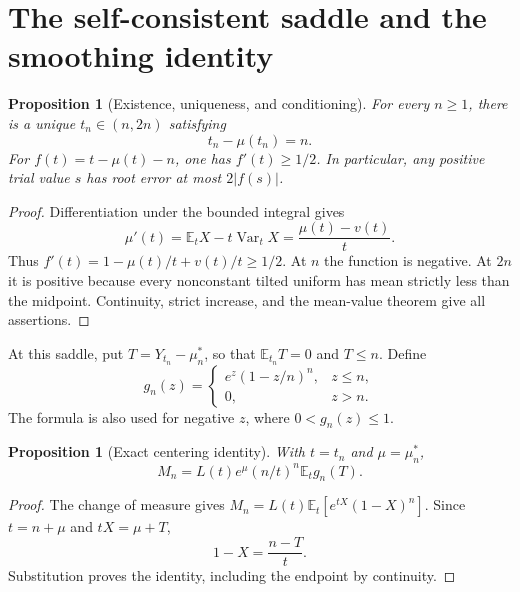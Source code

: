 \documentclass[11pt,a4paper]{article}
\numberwithin{equation}{section}
\newtheorem{proposition}[theorem]{Proposition}
\theoremstyle{definition}\newtheorem{definition}[theorem]{Definition}
\theoremstyle{remark}\newtheorem{remark}[theorem]{Remark}
\newcommand{\E}{\mathbb E}
\newcommand{\Var}{\operatorname{Var}}
\begin{document}
\section{The self-consistent saddle and the smoothing identity}
\label{sec:saddle}
\begin{proposition}[Existence, uniqueness, and conditioning]\label{prop:root}
For every $n\ge1$, there is a unique $t_n\in(n,2n)$ satisfying
\begin{equation}\label{eq:root}
 t_n-\mu(t_n)=n.
\end{equation}
For $f(t)=t-\mu(t)-n$, one has $f'(t)\ge1/2$. In particular, any positive trial value $s$ has root error at most $2|f(s)|$.
\end{proposition}
\begin{proof}
Differentiation under the bounded integral gives
\[
 \mu'(t)=\E_tX-t\Var_tX=\frac{\mu(t)-v(t)}{t}.
\]
Thus $f'(t)=1-\mu(t)/t+v(t)/t\ge1/2$.
At $n$ the function is negative. At $2n$ it is positive because every nonconstant tilted uniform has mean strictly less than the midpoint. Continuity, strict increase, and the mean-value theorem give all assertions.
\end{proof}

At this saddle, put $T=Y_{t_n}-\mu_n^*$, so that $\E_{t_n}T=0$ and $T\le n$. Define
\begin{equation}\label{eq:gn}
 g_n(z)=
 \begin{cases}
 e^z(1-z/n)^n,&z\le n,\\
 0,&z>n.
 \end{cases}
\end{equation}
The formula is also used for negative $z$, where $0<g_n(z)\le1$.

\begin{proposition}[Exact centering identity]\label{prop:center}
With $t=t_n$ and $\mu=\mu_n^*$,
\begin{equation}\label{eq:exactcenter}
 M_n=L(t)e^{\mu}(n/t)^n\E_tg_n(T).
\end{equation}
\end{proposition}
\begin{proof}
The change of measure gives $M_n=L(t)\E_t[e^{tX}(1-X)^n]$.
Since $t=n+\mu$ and $tX=\mu+T$,
\[
 1-X=\frac{n-T}{t}.
\]
Substitution proves the identity, including the endpoint by continuity.
\end{proof}
\end{document}
